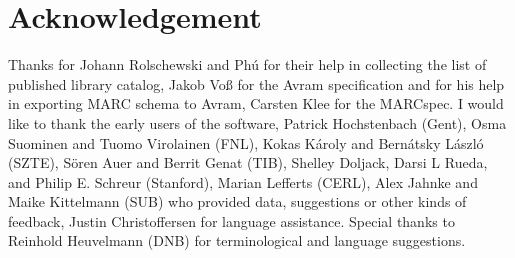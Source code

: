 \section{Acknowledgement}
Thanks for Johann Rolschewski and Phú for their help in collecting the list of published library catalog, Jakob Voß for the Avram specification and for his help in exporting MARC schema to Avram, Carsten Klee for the MARCspec. I would like to thank the early users of the software, Patrick Hochstenbach (Gent), Osma Suominen and Tuomo Virolainen (FNL), Kokas Károly and Bernátsky László (SZTE), Sören Auer and Berrit Genat (TIB), Shelley Doljack, Darsi L Rueda, and Philip E. Schreur (Stanford), Marian Lefferts (CERL), Alex Jahnke and Maike Kittelmann (SUB) who provided data, suggestions or other kinds of feedback, Justin Christoffersen for language assistance. Special thanks to Reinhold Heuvelmann (DNB) for terminological and language suggestions.

% 
% 
